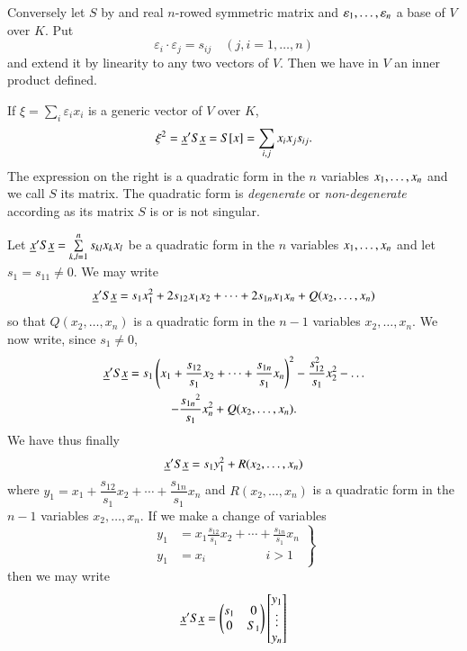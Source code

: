 Conversely let $S$ by and real $n$-rowed symmetric matrix and
$\varepsilon_{1},\ldots,\break\varepsilon_{n}$ a base of $V$ over $K$. Put 
$$
\varepsilon_{i}\cdot \varepsilon_{j}=s_{ij}\quad (j,i=1,\ldots,n)
$$
and extend it by linearity to any two vectors of $V$. Then we have in
$V$ an inner product defined.

If $\xi=\sum\limits_{i}\varepsilon_{i}x_{i}$ is a generic vector of $V$
over $K$,
$$
\xi^{2}=\underline{x}'S\underline{x}=S[x]=\sum_{i,j}x_{i}x_{j}s_{ij}.
$$
The expression on the right is a quadratic form in the $n$ variables
$x_{1},\ldots,\break x_{n}$ and we call $S$ its matrix. The quadratic form is
{\em degenerate} or {\em non-degenerate} according as its matrix $S$
is or is not singular.

Let $\underline{x}'S\underline{x}=\sum\limits^{n}_{k,l=1}s_{kl}x_{k}x_{l}$ be a
quadratic form in the $n$ variables $x_{1},\ldots,\break x_{n}$ and let
$s_{1}=s_{11}\neq 0$. We may write 
$$
\underline{x}'S\underline{x}=s_{1}x_{1}^{2}+2s_{12}x_{1}x_{2}+\cdots+2s_{1n}x_{1}x_{n}+Q(x_{2},\ldots,x_{n}) 
$$\pageoriginale
so that $Q(x_{2},\ldots,x_{n})$ is a quadratic form in the $n-1$
variables $x_{2},\ldots,x_{n}$. We now write, since $s_{1}\neq 0$,
\begin{gather*}
\underline{x}'S\underline{x} = s_{1}\left(x_{1}+\frac{s_{12}}{s_{1}} x_{2} +\cdots
+\frac{s_{1n}}{s_{1}} x_{n}\right)^{2} - \frac{s_{12}^{2}}{s_{1}}
x^{2}_{2}-\ldots\\  
-\frac{{s_{1n}}^2}{s_1} x^{2}_{n} + Q(x_{2},\ldots,x_{n}).
\end{gather*}
We have thus finally
$$
\underline{x}'S\underline{x}=s_{1}y^{2}_{1}+R(x_{2},\ldots,x_{n})
$$
where
$y_{1}=x_{1}+\dfrac{s_{12}}{s_{1}}x_{2}+\cdots+\dfrac{s_{1n}}{s_{1}}x_{n}$
and $R(x_{2},\ldots,x_{n})$ is a quadratic form in the $n-1$ variables
$x_{2},\ldots,x_{n}$. If we make a change of variables
\begin{equation*}
\left.
\begin{aligned}
y_{1} &=
x_{1}\frac{s_{12}}{s_{1}}x_{2}+\cdots+\frac{s_{1n}}{s_{1}}x_{n}\\
y_{1} &= x_{i}\hspace{2cm} i>1
\end{aligned}\right\}\tag{2}\label{c2:eq2}
\end{equation*}
then we may write
$$
\underline{x}'S\underline{x}=
\begin{pmatrix}
s_{1} & 0\\
0 & S_{1}
\end{pmatrix}
\begin{bmatrix}
y_{1}\\
\vdots\\
y_{n}
\end{bmatrix}
$$
